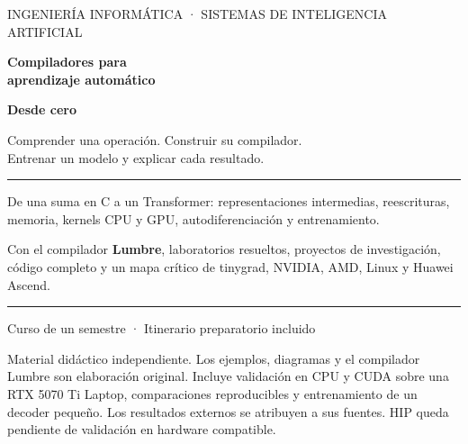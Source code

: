 \documentclass[12pt,a4paper,oneside]{report}
\begin{document}
\hypersetup{pageanchor=false}
\begin{titlepage}
\centering\vspace*{.8cm}
{\large INGENIERÍA INFORMÁTICA · SISTEMAS DE INTELIGENCIA ARTIFICIAL\par}
\vspace{1.0cm}
{\Huge\bfseries Compiladores para\\[.3cm]aprendizaje automático\par}
\vspace{.8cm}
{\LARGE\color{azul}\bfseries Desde cero\par}
\vspace{.7cm}
{\Large Comprender una operación. Construir su compilador.\\[.2cm]Entrenar un modelo y explicar cada resultado.\par}
\vspace{1cm}\rule{.88\textwidth}{.8pt}\vspace{.7cm}
\begin{minipage}{.85\textwidth}\large
De una suma en C a un Transformer: representaciones intermedias, reescrituras, memoria, kernels CPU y GPU, autodiferenciación y entrenamiento.
\par\medskip
Con el compilador \textbf{Lumbre}, laboratorios resueltos, proyectos de investigación, código completo y un mapa crítico de tinygrad, NVIDIA, AMD, Linux y Huawei Ascend.
\end{minipage}
\vspace{.65cm}\rule{.88\textwidth}{.8pt}
\vfill
{\large Curso de un semestre · Itinerario preparatorio incluido\par}
\vspace{.3cm}{\small Edición ampliada con el syllabus: 5 de octubre de 2026\par}
\vspace{.15cm}{\small Corte de investigación original: 1 de octubre de 2026\par}
\vspace{.35cm}
\begin{minipage}{.87\textwidth}\footnotesize
Material didáctico independiente. Los ejemplos, diagramas y el compilador Lumbre son elaboración original. Incluye validación en CPU y CUDA sobre una RTX 5070 Ti Laptop, comparaciones reproducibles y entrenamiento de un decoder pequeño. Los resultados externos se atribuyen a sus fuentes. HIP queda pendiente de validación en hardware compatible.
\end{minipage}
\end{titlepage}
\hypersetup{pageanchor=true}
\end{document}
